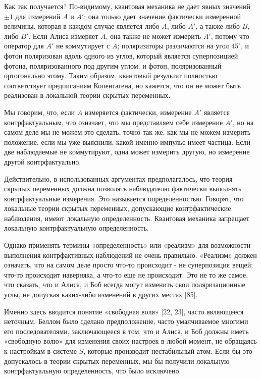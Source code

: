 \documentclass[main.tex]{subfiles}
\begin{document}
Как так получается? По-видимому, квантовая механика не дает явных значений $\pm 1$ для измерений $A$ и $A '$; она только дает значение фактически измеренной величины, которая в каждом случае является либо $A$, либо $A '$, а также либо $B$, либо $B'$. Если Алиса измеряет $A$, она также не может измерить $A '$, потому что оператор для $ A'$ не коммутирует с $A$; поляризаторы различаются на угол $45 ^\circ$, и фотон поляризован вдоль одного из углов, который является суперпозицией фотона, поляризованного под другим углом, и фотон, поляризованный ортогонально этому. Таким образом, квантовый результат полностью соответствует предписаниям Копенгагена, но кажется, что он не может быть реализован в локальной теории скрытых переменных.

Мы говорим, что, если $A$ измеряется фактически, измерение $A '$ является контрфактуальным, что означает, что мы представляем себе измерение $A'$, но на самом деле мы не можем это сделать, точно так же, как мы не можем измерить положение, если мы уже выяснили, какой именно импульс имеет частица. Если две наблюдаемые не коммутируют, одна может измерить другую, но измерение другой контрфактуально.

Действительно, в использованных аргументах предполагалось, что теория скрытых переменных должна позволять наблюдателю фактически выполнять контрфактуальные измерения. Это называется определенностью. Говорят, что локальные теории скрытых переменных, допускающие контрфактические наблюдения, имеют локальную определенность. Квантовая механика запрещает локальную контрфактуальную определенность.

Однако применять термины «определенность» или «реализм» для возможности выполнения контрфактивных наблюдений не очень правильно. «Реализм» должен означать, что на самом деле просто что-то происходит - не суперпозиция вещей; что-то происходит наверняка, а что-то еще не происходит. Это не то же самое, что сказать, что и Алиса, и Боб всегда могут изменить свои поляризационные углы, не допуская каких-либо изменений в других местах [85].

Именно здесь вводится понятие «свободная воля» [22, 23], часто являющееся неточным. Беллом было сделано предположение, часто умалчиваемое многими его последователями, заключающееся в том, что и Алиса, и Боб должны иметь «свободную волю» для изменения своих настроек в любой момент, не обращаясь к настройкам в системе $S$, которые производит нестабильный атом. Если бы это допускалось в теории скрытых переменных, мы бы получили локальную контрфактуальную определенность, что было исключено.
\end{document}
